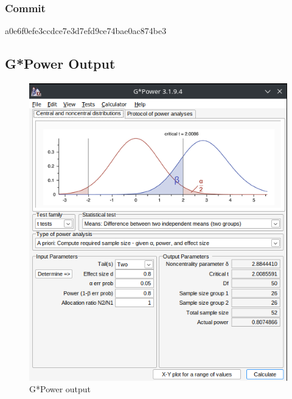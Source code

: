 \documentclass[lettersize,journal]{IEEEtran}
\begin{document}
\subsubsection{Commit}
a0e6f0efe3ccdce7e3d7efd9ce74bae0ac874be3

\subsection{G*Power Output}
\begin{figure}[h!]
                \includegraphics[width=0.5\paperwidth]{images/gpoweroutput.png}
		\caption{G*Power output}
                \label{figure 4}
\end{figure}

\vspace{11pt}


\vspace{11pt}


\vfill
\end{document}
